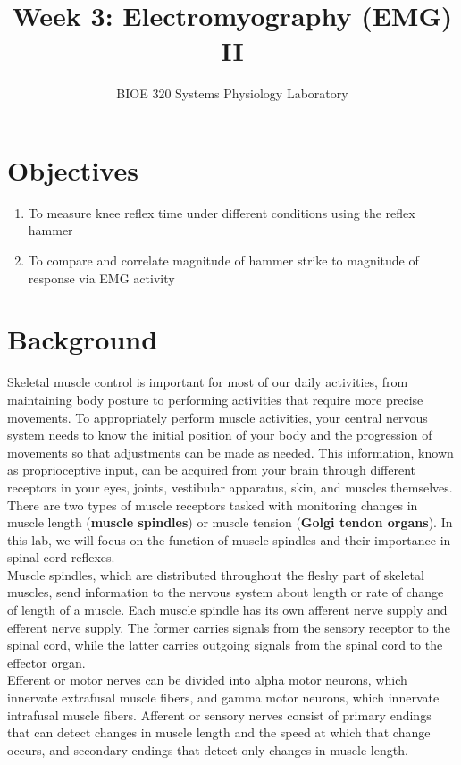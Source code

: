 \documentclass{article}
\title{Week 3: Electromyography (EMG) II}
\author{BIOE 320 Systems Physiology Laboratory}
\date{}
\begin{document}
\large
\maketitle

\section*{Objectives}
\begin{enumerate}
	\item To measure knee reflex time under different conditions using the reflex hammer
	\item To compare and correlate magnitude of hammer strike to magnitude of response via EMG activity
\end{enumerate}

\section*{Background}
Skeletal muscle control is important for most of our daily activities, from maintaining body posture to performing activities that require more precise movements. To appropriately perform muscle activities, your central nervous system needs to know the initial position of your body and the progression of movements so that adjustments can be made as needed. This information, known as proprioceptive input, can be acquired from your brain through different receptors in your eyes, joints, vestibular apparatus, skin, and muscles themselves. There are two types of muscle receptors tasked with monitoring changes in muscle length (\textbf{muscle spindles}) or muscle tension (\textbf{Golgi tendon organs}). In this lab, we will focus on the function of muscle spindles and their importance in spinal cord reflexes.\\

Muscle spindles, which are distributed throughout the fleshy part of skeletal muscles, send information to the nervous system about length or rate of change of length of a muscle. Each muscle spindle has its own afferent nerve supply and efferent nerve supply. The former carries signals from the sensory receptor to the spinal cord, while the latter carries outgoing signals from the spinal cord to the effector organ.\\

Efferent or motor nerves can be divided into alpha motor neurons, which innervate extrafusal muscle fibers, and gamma motor neurons, which innervate intrafusal muscle fibers. Afferent or sensory nerves consist of primary endings that can detect changes in muscle length and the speed at which that change occurs, and secondary endings that detect only changes in muscle length.\\
\end{document}

